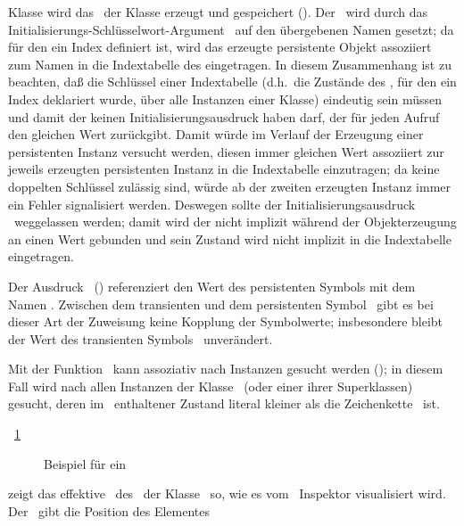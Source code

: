 Klasse wird das \clsdo\ der Klasse erzeugt und gespeichert
(\lprompt{\ref{enu:depclsmi}}). Der \Slt\/ \ wird durch das
Initialisierungs-Schl\"{u}sselwort-Argument \ auf den
\"{u}bergebenen Namen gesetzt; da f\"{u}r den \Slt\/ ein Index definiert ist,
wird das erzeugte persistente Objekt assoziiert zum Namen in die
Indextabelle des \Slt[s]\/ eingetragen. In diesem Zusammenhang ist zu
beachten, da\ss{} die Schl\"{u}ssel einer Indextabelle (d.h.\ die Zust\"{a}nde
des \Slt[s], f\"{u}r den ein Index deklariert wurde, \"{u}ber alle Instanzen
einer Klasse) eindeutig sein m\"{u}ssen und damit der \Slt\/ keinen
Initialisierungsausdruck haben darf, der f\"{u}r jeden Aufruf den
gleichen Wert zur\"{u}ckgibt. Damit w\"{u}rde im Verlauf der Erzeugung einer
persistenten Instanz versucht werden, diesen immer gleichen Wert
assoziiert zur jeweils erzeugten persistenten Instanz in die
Indextabelle einzutragen; da keine doppelten Schl\"{u}ssel zul\"{a}ssig
sind, w\"{u}rde ab der zweiten erzeugten Instanz immer ein Fehler
signalisiert werden. Deswegen sollte der Initialisierungsausdruck
\ia\ weggelassen werden; damit wird der \Slt\/ nicht implizit
w\"{a}hrend der Objekterzeugung an einen Wert gebunden und sein Zustand
wird nicht implizit in die Indextabelle eingetragen.
%
\par{}Der Ausdruck \ (\lprompt{\ref{enu:depclsmi}})
referenziert den Wert des persistenten Symbols mit dem Namen
. Zwischen dem transienten und dem persistenten Symbol
\ gibt es bei dieser Art der Zuweisung keine Kopplung der
Symbolwerte; insbesondere bleibt der Wert des transienten Symbols
\ unver\"{a}ndert.
%
\par{}Mit der Funktion \ kann assoziativ nach Instanzen
gesucht werden (\lprompt{\ref{enu:depclsps}}); in diesem Fall wird
nach allen Instanzen der Klasse \ (oder einer ihrer
Superklassen) gesucht, deren im \Slt\/ \ enthaltener
Zustand literal kleiner als die Zeichenkette \ ist.
%
\par{}\figurename~\ref{fig:plinesna} %
%
\begin{figure}[htbp]%
\centerline{}%
\caption{Beispiel f\"{u}r ein \protect\sltdo}%
\label{fig:plinesna}%
\end{figure}%
%
zeigt das effektive \sltdo\ des \Slt[s]\/ \ der Klasse
\ so, wie es vom \lw\ Inspektor visualisiert wird. Der
\Slt\/ \ gibt die Position des Elementes
